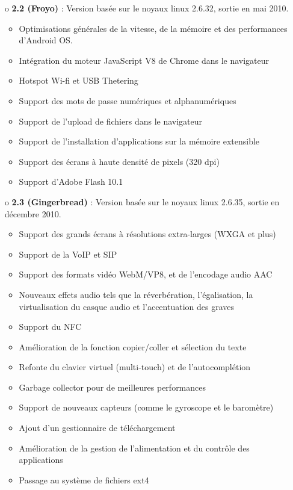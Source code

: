 \begin{itemize}
  \item[o] \textbf{2.2 (Froyo)} :
  Version basée sur le noyaux linux 2.6.32, sortie en mai 2010.
  \begin{itemize}
    \item Optimisations générales de la vitesse, de la mémoire et des performances
    d'Android OS.
    \item Intégration du moteur JavaScript V8 de Chrome dans le navigateur
    \item Hotspot Wi-fi et USB Thetering
    \item Support des mots de passe numériques et alphanumériques
    \item Support de l'upload de fichiers dans le navigateur
    \item Support de l'installation d'applications sur la mémoire extensible
    \item Support des écrans à haute densité de pixels (320 dpi)
    \item Support d'Adobe Flash 10.1
    \newline
  \end{itemize}
  
  \item[o] \textbf{2.3 (Gingerbread)} :
  Version basée sur le noyaux linux 2.6.35, sortie en décembre 2010.
  \begin{itemize}
    \item Support des grands écrans à résolutions extra-larges (WXGA et plus)
    \item Support de la VoIP et SIP
    \item Support des formats vidéo WebM/VP8, et de l'encodage audio AAC
    \item Nouveaux effets audio tels que la réverbération, l'égalisation, la
    virtualisation du casque audio et l'accentuation des graves
    \item Support du NFC
    \item Amélioration de la fonction copier/coller et sélection du texte
    \item Refonte du clavier virtuel (multi-touch) et de l'autocomplétion
    \item Garbage collector pour de meilleures performances
    \item Support de nouveaux capteurs (comme le gyroscope et le baromètre)
    \item Ajout d'un gestionnaire de téléchargement
    \item Amélioration de la gestion de l'alimentation et du contrôle des
    applications
    \item Passage au système de fichiers ext4
    \newline
    \end{itemize}
\end{itemize}
